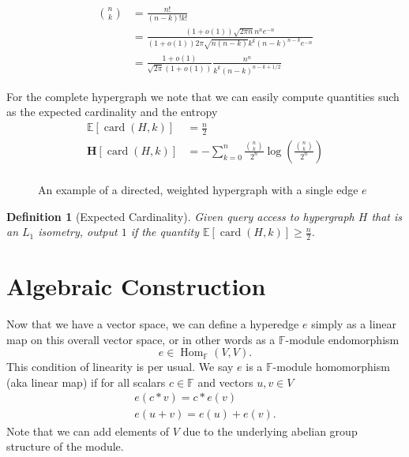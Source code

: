 \documentclass{article}
\newcommand{\parens}[1]{\left( #1 \right)}
\newcommand{\brackets}[1]{\left[ #1 \right]}
\newcommand{\expect}[1]{\mathbb{E}\brackets{#1}}
\newcommand{\field}{\mathbb{F}}
\DeclareMathOperator{\Hom}{Hom}
\DeclareMathOperator{\card}{card}
\newcommand{\cardi}[1]{\card \parens{ #1 }}
\newtheorem{defn}{Definition}
\begin{document}
\begin{align}
    \binom{n}{k} &= \frac{n!}{(n-k)! k!} \\
    &= \frac{(1 + o(1))\sqrt{2 \pi n} n^n e^{-n}}{(1+o(1)) 2 \pi \sqrt{n (n-k)} k^k (n-k)^{n-k} e^{-n}} \\
    &= \frac{1 + o(1)}{\sqrt{2 \pi}(1+o(1))} \frac{n^n}{ k^k (n-k)^{n-k + 1/2}}
\end{align}

For the complete hypergraph we note that we can easily compute quantities such as the expected cardinality and the entropy
\begin{align}
    \expect{\cardi{H, k}} &= \frac{n}{2} \\
    \mathbf{H} \brackets{\cardi{H, k}} &= - \sum_{k=0}^{n} \frac{\binom{n}{k}}{2^n} \log \parens{\frac{\binom{n}{k}}{2^n}}\\
\end{align}


\begin{figure}
    \caption[Hypergraph]{An example of a directed, weighted hypergraph with a single edge $e$}


\end{figure}

\begin{defn}[Expected Cardinality]
    Given query access to hypergraph $H$ that is an $L_1$ isometry, output $1$ if the quantity $\expect{\cardi{H,k}} \geq \frac{n}{2}$.
\end{defn}


\section{Algebraic Construction}
Now that we have a vector space, we can define a hyperedge $e$ simply as a linear map on this overall vector space, or in other words as a $\field$-module endomorphism
\begin{equation}
    e \in \Hom_{\field} (V, V).
\end{equation}
This condition of linearity is per usual. We say $e$ is a $\field$-module homomorphism (aka linear map) if for all scalars $c \in \field$ and vectors $u, v \in V$
\begin{align}
    e(c * v) = c * e(v) \\
    e (u + v) = e(u) + e(v).
\end{align}
Note that we can add elements of $V$ due to the underlying abelian group structure of the module. 
\end{document}
